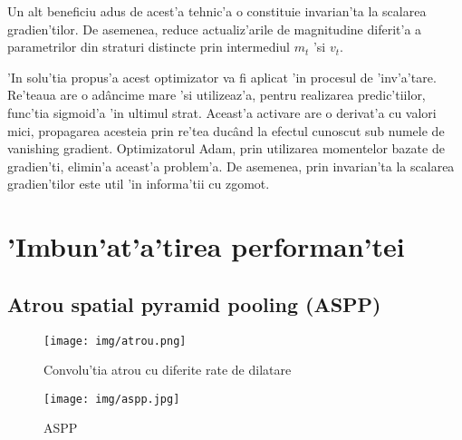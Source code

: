 \documentclass[12pt,a4paper,twoside]{report}
\begin{document}
Un alt  beneficiu adus de acest'a tehnic'a o constituie invarian'ta la scalarea gradien'tilor. De asemenea, reduce actualiz'arile de magnitudine diferit'a a parametrilor din straturi distincte prin intermediul  \textit{$m_t$} 'si \textit{$v_t$}.

\newpage
'In solu'tia propus'a acest optimizator va fi aplicat 'in procesul de 'inv'a'tare. Re'teaua are o ad\^ancime mare 'si utilizeaz'a, pentru realizarea predic'tiilor, func'tia sigmoid'a 'in ultimul strat. Aceast'a activare are o derivat'a cu valori mici, propagarea acesteia prin re'tea duc\^and la efectul cunoscut sub numele de vanishing gradient. Optimizatorul Adam, prin utilizarea momentelor bazate de gradien'ti, elimin'a aceast'a problem'a. De asemenea, prin invarian'ta la scalarea gradien'tilor este util 'in informa'tii cu zgomot.

\section{'Imbun'at'a'tirea performan'tei}
\subsection{Atrou spatial pyramid pooling (ASPP)}
\label{ch:aspp}

\begin{figure}[H]
\centering
\begin{minipage}[b]{.5\textwidth}
  \centering
  \texttt{[image: img/atrou.png]}
  \centering
  \caption{Convolu'tia atrou cu diferite rate de dilatare \protect\footnotemark}
  \label{fig:atrou}
\end{minipage}%
\begin{minipage}[b]{0.5\textwidth}
  \centering
  \texttt{[image: img/aspp.jpg]}
  \centering
  \caption{ASPP \protect\footnotemark}
  \label{fig:aspp}
\end{minipage}
\end{figure}
\end{document}
